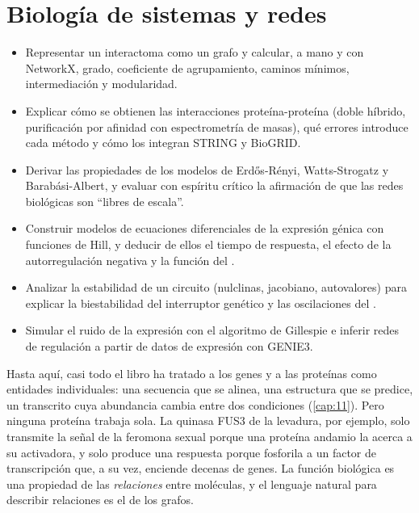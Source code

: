 \chapter{Biología de sistemas y redes}\label{cap:16}


\begin{objetivos}
\begin{itemize}
  \item Representar un interactoma como un grafo y calcular, a mano y con NetworkX, grado, coeficiente de agrupamiento, caminos mínimos, intermediación y modularidad.
  \item Explicar cómo se obtienen las interacciones proteína-proteína (doble híbrido, purificación por afinidad con espectrometría de masas), qué errores introduce cada método y cómo los integran STRING y BioGRID.
  \item Derivar las propiedades de los modelos de Erdős-Rényi, Watts-Strogatz y Barabási-Albert, y evaluar con espíritu crítico la afirmación de que las redes biológicas son ``libres de escala''.
  \item Construir modelos de ecuaciones diferenciales de la expresión génica con funciones de Hill, y deducir de ellos el tiempo de respuesta, el efecto de la autorregulación negativa y la función del .
  \item Analizar la estabilidad de un circuito (nulclinas, jacobiano, autovalores) para explicar la biestabilidad del interruptor genético y las oscilaciones del .
  \item Simular el ruido de la expresión con el algoritmo de Gillespie e inferir redes de regulación a partir de datos de expresión con GENIE3.
\end{itemize}
\end{objetivos}

Hasta aquí, casi todo el libro ha tratado a los genes y a las proteínas como entidades individuales: una secuencia que se alinea, una estructura que se predice, un transcrito cuya abundancia cambia entre dos condiciones (\cref{cap:11}). Pero ninguna proteína trabaja sola. La quinasa FUS3 de la levadura, por ejemplo, solo transmite la señal de la feromona sexual porque una proteína andamio la acerca a su activadora, y solo produce una respuesta porque fosforila a un factor de transcripción que, a su vez, enciende decenas de genes. La función biológica es una propiedad de las \emph{relaciones} entre moléculas, y el lenguaje natural para describir relaciones es el de los grafos.

